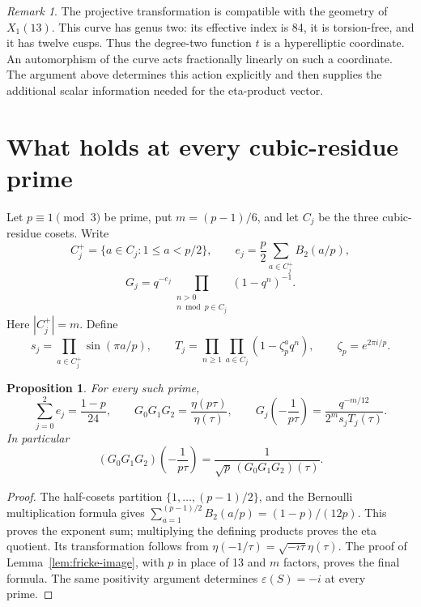 \documentclass[11pt]{amsart}
\newtheorem{proposition}[theorem]{Proposition}
\theoremstyle{remark}
\newtheorem{remark}[theorem]{Remark}
\begin{document}
\begin{remark}
The projective transformation is compatible with the geometry of $X_1(13)$. This curve has genus two: its effective index is 84, it is torsion-free, and it has twelve cusps. Thus the degree-two function $t$ is a hyperelliptic coordinate. An automorphism of the curve acts fractionally linearly on such a coordinate. The argument above determines this action explicitly and then supplies the additional scalar information needed for the eta-product vector.
\end{remark}

\section{What holds at every cubic-residue prime}
Let $p\equiv1\pmod3$ be prime, put $m=(p-1)/6$, and let $C_j$ be the three cubic-residue cosets. Write
\[
 C_j^+=\{a\in C_j:1\le a<p/2\},\qquad
 e_j=\frac p2\sum_{a\in C_j^+}B_2(a/p),
\]
\[
 G_j=q^{-e_j}\prod_{\substack{n>0\\n\bmod p\in C_j}}(1-q^n)^{-1}.
\]
Here $|C_j^+|=m$. Define
\[
 s_j=\prod_{a\in C_j^+}\sin(\pi a/p),\qquad
 T_j=\prod_{n\ge1}\prod_{a\in C_j}(1-\zeta_p^a q^n),\qquad
 \zeta_p=e^{2\pi i/p}.
\]

\begin{proposition}\label{prop:general}
For every such prime,
\begin{equation}\label{eq:general}
 \sum_{j=0}^2 e_j=\frac{1-p}{24},\qquad
 G_0G_1G_2=\frac{\eta(p\tau)}{\eta(\tau)},\qquad
 G_j\left(-\frac1{p\tau}\right)=\frac{q^{-m/12}}{2^ms_jT_j(\tau)}.
\end{equation}
In particular
\[
 (G_0G_1G_2)\left(-\frac1{p\tau}\right)
 =\frac{1}{\sqrt p\,(G_0G_1G_2)(\tau)}.
\]
\end{proposition}
\begin{proof}
The half-cosets partition $\{1,\ldots,(p-1)/2\}$, and the Bernoulli multiplication formula gives
$\sum_{a=1}^{(p-1)/2}B_2(a/p)=(1-p)/(12p)$.
This proves the exponent sum; multiplying the defining products proves the eta quotient. Its transformation follows from $\eta(-1/\tau)=\sqrt{-i\tau}\eta(\tau)$. The proof of Lemma~\ref{lem:fricke-image}, with $p$ in place of 13 and $m$ factors, proves the final formula. The same positivity argument determines $\varepsilon(S)=-i$ at every prime.
\end{proof}
\end{document}
